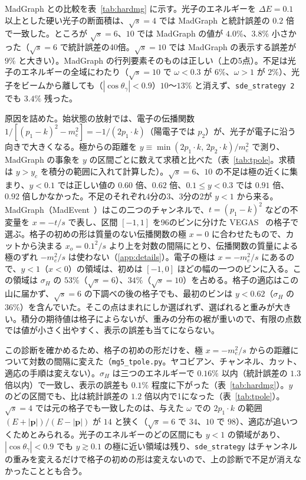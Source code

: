 \documentclass[a4paper,10pt]{ltjsarticle}
\begin{document}
MadGraph との比較を表~\ref{tab:hardmg} に示す。光子のエネルギーを $\Delta E=0.1$ 以上とした硬い光子の断面積は、$\sqrt s=4$ では MadGraph と統計誤差の $0.2$ 倍で一致した。ところが $\sqrt s=6$、$10$ では MadGraph の値が $4.0\%$、$3.8\%$ 小さかった（$\sqrt s=6$ で統計誤差の40倍。$\sqrt s=10$ では MadGraph の表示する誤差が $9\%$ と大きい）。MadGraph の行列要素そのものは正しい（上の5点）。不足は光子のエネルギーの全域にわたり（$\sqrt s=10$ で $\omega<0.3$ が $6\%$、$\omega>1$ が $2\%$）、光子をビームから離しても（$|\cos\theta_\gamma|<0.9$）$10$〜$13\%$ と消えず、\texttt{sde\_strategy 2} でも $3.4\%$ 残った。

原因を詰めた。始状態の放射では、電子の伝播関数 $1/[(p_1-k)^2-m_e^2]=-1/(2p_1\cdot k)$（陽電子では $p_2$）が、光子が電子に沿う向きで大きくなる。極からの距離を $y\equiv\min(2p_1\cdot k,\,2p_2\cdot k)/m_e^2$ で測り、MadGraph の事象を $y$ の区間ごとに数えて求積と比べた（表~\ref{tab:tpole}。求積は $y>y_c$ を積分の範囲に入れて計算した）。$\sqrt s=6$、$10$ の不足は極の近くに集まり、$y<0.1$ では正しい値の $0.60$ 倍、$0.62$ 倍、$0.1\le y<0.3$ では $0.91$ 倍、$0.92$ 倍しかなかった。不足のそれぞれ4分の3、3分の2が $y<1$ から来る。MadGraph（MadEvent~\cite{madevent}）はこの二つのチャンネルで、$t=(p_1-k)^2$ などの不変量を $x=-t/s$ で表し、区間 $[-1,1]$ を96のビンに分けた VEGAS~\cite{vegas} の格子で選ぶ。格子の初めの形は質量のない伝播関数の極 $x=0$ に合わせたもので、カットから決まる $x_o=0.1^2/s$ より上を対数の間隔にとり、伝播関数の質量による極のずれ $-m_e^2/s$ は使わない（\ref{app:details}）。電子の極は $x=-m_e^2/s$ にあるので、$y<1$（$x<0$）の領域は、初めは $[-1,0]$ ほどの幅の一つのビンに入る。この領域は $\sigma_H$ の $53\%$（$\sqrt s=6$）、$34\%$（$\sqrt s=10$）を占める。格子の適応はこの山に届かず、$\sqrt s=6$ の下調べの後の格子でも、最初のビンは $y<0.62$（$\sigma_H$ の $36\%$）を含んでいた。そこの点はまれにしか選ばれず、選ばれると重みが大きい。積分の期待値は格子によらないが、重みの分布の裾が重いので、有限の点数では値が小さく出やすく、表示の誤差も当てにならない。

この診断を確かめるため、格子の初めの形だけを、極 $x=-m_e^2/s$ からの距離について対数の間隔に変えた（\texttt{mg5\_tpole.py}。ヤコビアン、チャンネル、カット、適応の手順は変えない）。$\sigma_H$ は三つのエネルギーで $0.16\%$ 以内（統計誤差の $1.3$ 倍以内）で一致し、表示の誤差も $0.1\%$ 程度に下がった（表~\ref{tab:hardmg}）。$y$ のどの区間でも、比は統計誤差の $1.2$ 倍以内で1になった（表~\ref{tab:tpole}）。$\sqrt s=4$ では元の格子でも一致したのは、与えた $\omega$ での $2p_1\cdot k$ の範囲 $(E+|\boldsymbol p|)/(E-|\boldsymbol p|)$ が $14$ と狭く（$\sqrt s=6$ で $34$、$10$ で $98$）、適応が追いつくためとみられる。光子のエネルギーのどの区間にも $y<1$ の領域があり、$|\cos\theta_\gamma|<0.9$ でも $y\gtrsim0.1$ の極に近い領域は残り、\texttt{sde\_strategy} はチャンネルの重みを変えるだけで格子の初めの形は変えないので、上の診断で不足が消えなかったこととも合う。
\end{document}
